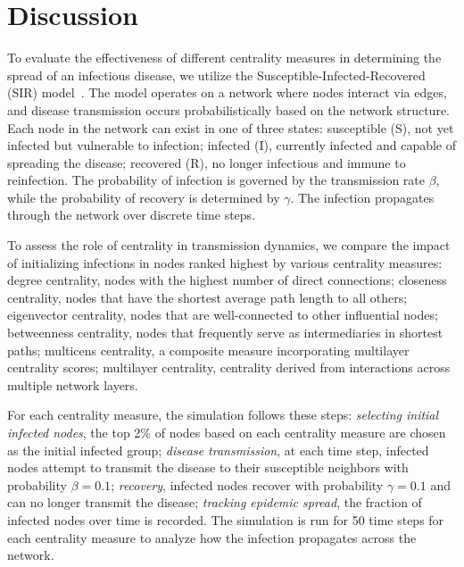 \documentclass[10pt,letterpaper]{article}
\begin{document}
\section*{Discussion}
To evaluate the effectiveness of different centrality measures in determining the spread of an infectious disease, we utilize the Susceptible-Infected-Recovered (SIR) model~\cite{bailey1977theory,wang2011epidemics,feng2009networks}. The model operates on a network where nodes interact via edges, and disease transmission occurs probabilistically based on the network structure. Each node in the network can exist in one of three states: susceptible (S), not yet infected but vulnerable to infection; infected (I), currently infected and capable of spreading the disease; recovered (R), no longer infectious and immune to reinfection. The probability of infection is governed by the transmission rate $\beta$, while the probability of recovery is determined by $\gamma$. The infection propagates through the network over discrete time steps. 

To assess the role of centrality in transmission dynamics, we compare the impact of initializing infections in nodes ranked highest by various centrality measures: degree centrality, nodes with the highest number of direct connections; closeness centrality, nodes that have the shortest average path length to all others; eigenvector centrality, nodes that are well-connected to other influential nodes; betweenness centrality, nodes that frequently serve as intermediaries in shortest paths; multicens centrality, a composite measure incorporating multilayer centrality scores; multilayer centrality, centrality derived from interactions across multiple network layers.

For each centrality measure, the simulation follows these steps: {\it selecting initial infected nodes}, the top 2\% of nodes based on each centrality measure are chosen as the initial infected group; {\it disease transmission}, at each time step, infected nodes attempt to transmit the disease to their susceptible neighbors with probability $\beta = 0.1$; {\it recovery}, infected nodes recover with probability $\gamma = 0.1$ and can no longer transmit the disease; {\it tracking epidemic spread}, the fraction of infected nodes over time is recorded. The simulation is run for 50 time steps for each centrality measure to analyze how the infection propagates across the network.
\end{document}
